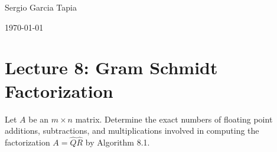 \documentclass[12pt]{article}
\newenvironment{ex}[2][Exercise]{\begin{trivlist}
		\item[\hskip \labelsep {\bfseries #1}\hskip \labelsep {\bfseries #2.}]}{\end{trivlist}}
\begin{document}

\noindent Sergio Garcia Tapia \hfill

 \hfill 

 \hfill 

\noindent\today
\section*{Lecture 8: Gram Schmidt Factorization}

\begin{ex}{1}
	Let $A$ be an $m\times n$ matrix. Determine the exact numbers of floating point additions, subtractions, and
	multiplications involved in computing the factorization $A=\hat{Q}\hat{R}$ by Algorithm 8.1.
\end{ex}
\end{document}
